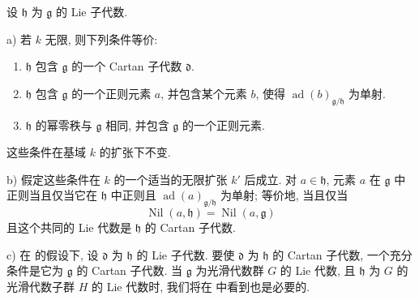 \begin{proposition}
设 \(\mathfrak h\) 为 \(\mathfrak g\) 的 Lie 子代数.

\textup{a)} 若 \(k\) 无限, 则下列条件等价:
\begin{enumerate}
\item[(i)]
\(\mathfrak h\) 包含 \(\mathfrak g\) 的一个 Cartan 子代数 \(\mathfrak d\).
\item[(ii)]
\(\mathfrak h\) 包含 \(\mathfrak g\) 的一个正则元素 \(a\), 并包含某个元素 \(b\), 使得 \(\operatorname{ad}(b)_{\mathfrak g/\mathfrak h}\) 为单射.
\item[(iii)]
\(\mathfrak h\) 的幂零秩与 \(\mathfrak g\) 相同, 并包含 \(\mathfrak g\) 的一个正则元素.
\end{enumerate}
这些条件在基域 \(k\) 的扩张下不变.

\textup{b)} 假定这些条件在 \(k\) 的一个适当的无限扩张 \(k'\) 后成立. 对 \(a\in\mathfrak h\), 元素 \(a\) 在 \(\mathfrak g\) 中正则当且仅当它在 \(\mathfrak h\) 中正则且 \(\operatorname{ad}(a)_{\mathfrak g/\mathfrak h}\) 为单射; 等价地, 当且仅当
\[
  \operatorname{Nil}(a,\mathfrak h)
  =
  \operatorname{Nil}(a,\mathfrak g)
\]
且这个共同的 Lie 代数是 \(\mathfrak h\) 的 Cartan 子代数.

\textup{c)} 在  的假设下, 设 \(\mathfrak d\) 为 \(\mathfrak h\) 的 Lie 子代数. 要使 \(\mathfrak d\) 为 \(\mathfrak h\) 的 Cartan 子代数, 一个充分条件是它为 \(\mathfrak g\) 的 Cartan 子代数. 当 \(\mathfrak g\) 为光滑代数群 \(G\) 的 Lie 代数, 且 \(\mathfrak h\) 为 \(G\) 的光滑代数子群 \(H\) 的 Lie 代数时, 我们将在  中看到也是必要的.
\end{proposition}

